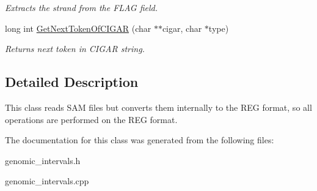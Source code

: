 \begin{DoxyCompactItemize}
\begin{DoxyCompactList}\small\item\em Extracts the strand from the FLAG field. \end{DoxyCompactList}\item 
\hypertarget{classGenomicRegionSAMToREG_adbc035818bcc64cc715b16c34b314799}{
long int \hyperlink{classGenomicRegionSAMToREG_adbc035818bcc64cc715b16c34b314799}{GetNextTokenOfCIGAR} (char $\ast$$\ast$cigar, char $\ast$type)}
\label{classGenomicRegionSAMToREG_adbc035818bcc64cc715b16c34b314799}

\begin{DoxyCompactList}\small\item\em Returns next token in CIGAR string. \end{DoxyCompactList}\end{DoxyCompactItemize}


\subsection{Detailed Description}
This class reads SAM files but converts them internally to the REG format, so all operations are performed on the REG format. 

The documentation for this class was generated from the following files:\begin{DoxyCompactItemize}
\item 
genomic\_\-intervals.h\item 
genomic\_\-intervals.cpp\end{DoxyCompactItemize}

